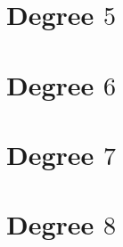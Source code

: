 \documentclass{amsart}
\numberwithin{equation}{section}
\theoremstyle{definition}
\theoremstyle{remark}
\begin{document}
\section{Degree $5$}{
}
\section{Degree $6$}{
}
\section{Degree $7$}{
}
\section{Degree $8$}{
}

\nocite{*}











\end{document}
